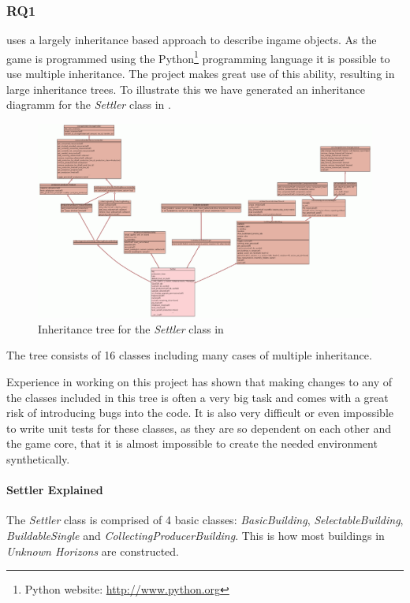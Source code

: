 \subsubsection{RQ1}
\UH{} uses a largely inheritance based approach to describe ingame objects. As the game is programmed using
the Python\footnote{Python website: \url{http://www.python.org}} programming language it is possible to use multiple
inheritance. The project makes great use of this ability, resulting in large inheritance trees. To illustrate this we
have generated an inheritance diagramm for the \textit{Settler} class in . 
\begin{figure}[!htb]
\includegraphics[angle=90,scale=0.25]{pics/settler_uml}
\caption{Inheritance tree for the \textit{Settler} class in \UH{}}
\label{fig:settleruml}
\end{figure}
The tree consists of 16 classes including many cases of multiple inheritance. 

Experience in working on this project has shown that making changes to any of the classes included in this tree is often
a very big task and comes with a great risk of introducing bugs into the code. It is also very difficult or even
impossible to write unit tests for these classes, as they are so dependent on each other and the game core, that it is
almost impossible to create the needed environment synthetically.

\paragraph{Settler Explained}
The \textit{Settler} class is comprised of 4 basic classes: \textit{BasicBuilding}, \textit{SelectableBuilding},
\textit{BuildableSingle} and \textit{CollectingProducerBuilding}. This is how most buildings in \textit{Unknown
Horizons} are constructed. 

